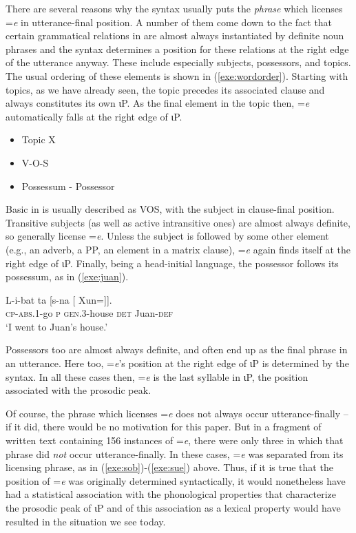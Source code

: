 \documentclass[output=paper,
modfonts
]{LSP/langsci}
\begin{document}
There are several reasons why the syntax usually puts the \emph{phrase} which licenses
=\emph{e} in utterance-final position. A number of them come down to the fact that certain grammatical relations in
 are almost always instantiated by definite noun phrases and the syntax determines a position for
these relations at the right edge of the utterance anyway.  
These include especially subjects, possessors, and topics. The usual ordering of these elements is shown in (\ref{exe:wordorder}).
Starting with topics, as we have already seen, the topic precedes its associated clause and always constitutes its own ιP.
As the final element in the topic then, =\emph{e} automatically falls at the right edge of ιP.   
\begin{exe}
\ex
\begin{itemize}
\item[\textopenbullet]
Topic  X
\item[\textopenbullet]
V\--O\--S
\item[\textopenbullet]
Possessum \-- Possessor
\end{itemize}
\label{exe:wordorder}
\end{exe}
Basic  in  is usually described as VOS, with the subject in clause-final position. Transitive subjects (as well as active
intransitive ones) are almost always definite, so generally license =\emph{e}. Unless the subject is followed by some other element (e.g.,
an adverb, a PP, an element in a matrix clause), =\emph{e} again finds itself at the right edge of ιP.
Finally,  being a head-initial language, the possessor follows its possessum, as in (\ref{exe:juan}).
 \begin{exe}
 \ex\label{exe:juan}\bridgeoverex
 \gll L-i-bat ta [s-na [ Xun=]]. \\
 \textsc{cp-abs.1}-go \textsc{p} \textsc{gen.3}-house \textsc{det} Juan-\textsc{def} \\
 \glt `I went to Juan's house.'
 \end{exe} 
 Possessors too are almost always definite, and often end up as the final phrase in an utterance. Here too,
 =\emph{e}'s position at the right edge of ιP is determined by the syntax. In all these cases then,
 =\emph{e} is the last syllable in ιP, the position associated with the prosodic peak. 
  
 Of course, the phrase which licenses =\emph{e} does not always occur utterance-finally -- if it did, there would be no
 motivation for this paper.  But in a fragment of written text containing 156 instances of =\emph{e}, there were only three in which
 that phrase did \emph{not} occur utterance-finally. In these cases, 
  =\emph{e} was separated from its licensing phrase, as in  (\ref{exe:sob})-(\ref{exe:sue}) above. Thus, if it is true that
 the position of =\emph{e} was originally determined syntactically, it would nonetheless have had a
 statistical association with the phonological properties that characterize the prosodic peak of ιP and
 of this association as a lexical property would have resulted in the situation we see today.  
\end{document}
